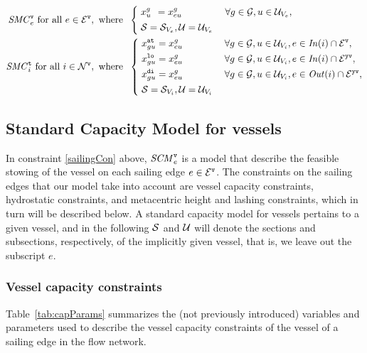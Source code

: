 \begin{alignat}{3}
\label{sailingCon}
\mi{SMC}^\ttt{v}_e \text{ for all } e\in \mc{E}^\ttt{v}, \text{ where }\;
			&\left\{\;
			\begin{aligned}
					&x^g_{u\phantom{g}} = x^g_{eu} & \;\forall g\in\mc{G}, u\in \mc{U}_{V_e},\\
					&\mc{S} = \mc{S}_{V_e}, \mc{U} = \mc{U}_{V_e} 
			\end{aligned}\right.\\
%
\label{terminalCon}
\mi{SMC}^\ttt{t}_i \text{ for all } i\in\mc{N}^\ttt{v}, \text{ where } \;
			&\left\{\;
			\begin{aligned}
					&x^\ttt{at}_{gu} = x^g_{eu} && \;\forall g\in\mc{G}, u\in \mc{U}_{V_i}, e\in \mi{In}(i)\cap\mc{E}^\ttt{v},\\
					&x^\ttt{lo}_{gu} = x^g_{eu} && \;\forall g\in\mc{G}, u\in \mc{U}_{V_i}, e\in \mi{In}(i)\cap\mc{E}^\ttt{yv},\\
					&x^\ttt{di}_{gu} = x^g_{eu} && \;\forall g\in\mc{G}, u\in \mc{U}_{V_i}, e\in \mi{Out}(i)\cap\mc{E}^\ttt{yv},\\
					&\mc{S} = \mc{S}_{V_i}, \mc{U} = \mc{U}_{V_i} 
			\end{aligned}\right.
\end{alignat}

\subsection{Standard Capacity Model for vessels}
In constraint \eqref{sailingCon} above, $\mathit{SCM}^\texttt{v}_{e}$ is a model that describe the feasible stowing of the vessel on each sailing edge $e\in \mathcal{E}^\texttt{v}$.  
The constraints on the sailing edges that our model take into account are vessel capacity constraints, hydrostatic constraints, and metacentric height and lashing constraints, which in turn will be described below. {A standard capacity model for vessels pertains to a given vessel, and in the following $\mathcal{S}$ and $\mathcal{U}$ will denote the sections and subsections, respectively, of the implicitly given vessel, that is, we leave out the subscript $e$.}
 
\subsubsection{Vessel capacity constraints}
Table~\ref{tab:capParams} summarizes the (not previously introduced) variables and parameters used to describe the vessel capacity constraints of the vessel of a sailing edge in the flow network.

